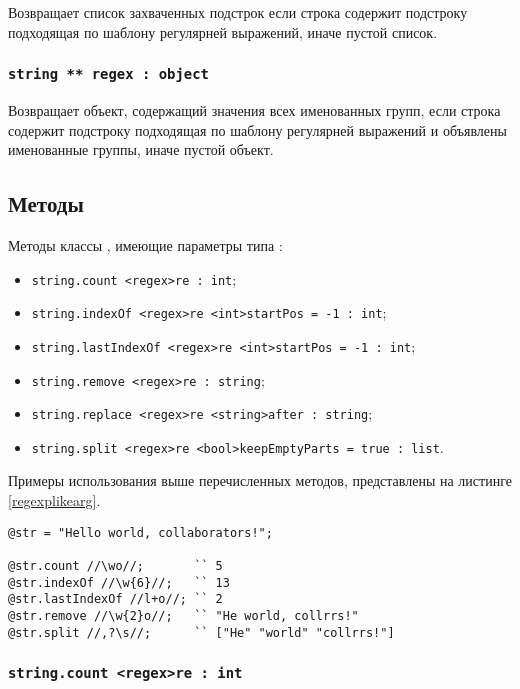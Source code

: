 \documentclass[a4paper, 14pt]{extarticle}
\newenvironment{icItems}
	{ \begin{itemize} [noitemsep,nolistsep] }
	{ \end{itemize} }
\begin{document}
Возвращает список захваченных подстрок если строка содержит подстроку подходящая по шаблону регулярней выражений, иначе пустой список.

\subsubsection{\lstinline|string ** regex : object|}

Возвращает объект, содержащий значения всех именованных групп, если строка содержит подстроку подходящая по шаблону регулярней выражений и объявлены именованные группы, иначе пустой объект.


\subsection{Методы}

Методы классы \str{}, имеющие параметры типа \regex{}:
\begin{icItems}
\item
	\lstinline|string.count <regex>re : int|;
\item
	\lstinline|string.indexOf <regex>re <int>startPos = -1 : int|;
\item
	\lstinline|string.lastIndexOf <regex>re <int>startPos = -1 : int|;
\item
	\lstinline|string.remove <regex>re : string|;
\item 
	\lstinline|string.replace <regex>re <string>after : string|;
\item
	\lstinline|string.split <regex>re <bool>keepEmptyParts = true : list|.
\end{icItems}

Примеры использования выше перечисленных методов, представлены на листинге \ref{regexplikearg}.

\begin{lstlisting}[caption=Регулярные выражения в качестве аргумента, label=regexplikearg]
@str = "Hello world, collaborators!";

@str.count //\wo//;       `` 5
@str.indexOf //\w{6}//;   `` 13
@str.lastIndexOf //l+o//; `` 2
@str.remove //\w{2}o//;   `` "He world, collrrs!"
@str.split //,?\s//;      `` ["He" "world" "collrrs!"]
\end{lstlisting}


\subsubsection{\lstinline|string.count <regex>re : int|}
\end{document}
